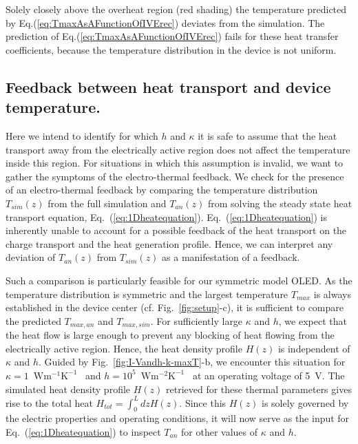 \documentclass[%
9pt,
 aip,
rsi,%
 amsmath,amssymb,
preprint,%
]{revtex4-1}
\newcommand{\thermalconductivity}{$\mathrm{W m^{-1} K^{-1}}$}
\newcommand{\hcoefficient}{$\mathrm{W m^{-2} K^{-1}}$}
\begin{document}
Solely closely above the overheat region (red shading) the temperature predicted by Eq.(\ref{eq:TmaxAsAFunctionOfIVErec}) deviates from the simulation. The prediction of Eq.(\ref{eq:TmaxAsAFunctionOfIVErec}) fails for these heat transfer coefficients, because the temperature distribution in the device is not uniform.



\subsection*{Feedback between heat transport and device temperature.}

Here we intend to identify for which $h$ and $\kappa$ it is safe to assume that the heat transport away from the electrically active region does not affect the temperature inside this region. 
For situations in which this assumption is invalid, we want to gather the symptoms of the electro-thermal feedback.
We check for the presence of an electro-thermal feedback by comparing the temperature distribution $T_{sim}(z)$ from the full simulation and $T_{an}(z)$ from solving the steady state heat transport equation, Eq.~(\ref{eq:1Dheatequation}).
Eq.~(\ref{eq:1Dheatequation}) is inherently unable to account for a possible feedback of the heat transport on the charge transport and the heat generation profile.
Hence, we can interpret any deviation of $T_{an}(z)$ from $T_{sim}(z)$ as a manifestation of a feedback.

Such a comparison is particularly feasible for our symmetric model OLED.
As the temperature distribution is symmetric and the largest temperature $T_{max}$ is always established in the device center (cf. Fig.~\ref{fig:setup}-c), it is sufficient to compare the predicted $T_{max,an}$ and $T_{max,sim}$.
For sufficiently large $\kappa$ and $h$, we expect that the heat flow is large enough to prevent any blocking of heat flowing from the electrically active region. 
Hence, the heat density profile $H(z)$ is independent of $\kappa$ and $h$. %
Guided by Fig.~\ref{fig:I-Vandh-k-maxT}-b, we encounter this situation for $\kappa = 1$~\thermalconductivity~ and $h = 10^5$~\hcoefficient~ at an operating voltage of 5~V.  
The simulated heat density profile $H(z)$ retrieved for these thermal parameters gives rise to the total heat $H_{tot} = \int_0^L dz H(z)$. 
Since this $H(z)$ is solely governed by the electric properties and operating conditions, it will now serve as the input for Eq.~(\ref{eq:1Dheatequation}) to inspect $T_{an}$ for other values of $\kappa$ and $h$.
\end{document}
